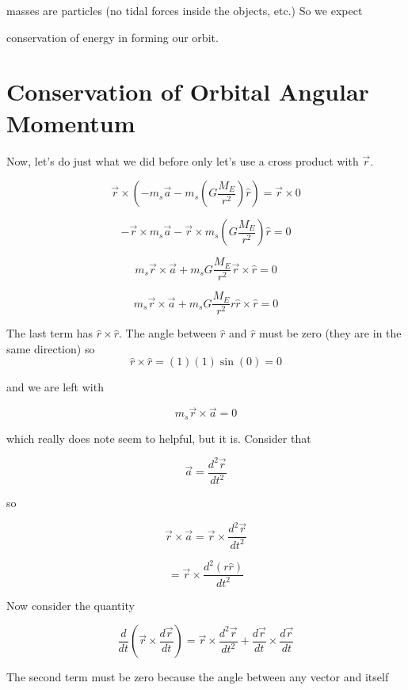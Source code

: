 masses are particles (no tidal forces inside the objects, etc.) So we expect

conservation of energy in forming our orbit.


\section{Conservation of Orbital Angular Momentum}


Now, let's do just what we did before only let's use a cross product with 
$\overrightarrow{r}$. 

$$\overrightarrow{r}\times \left( -m_{s}\overrightarrow{a}-m_{s}\left( G\frac{M_{E}}{r^{2}}\right) \hat{r}\right) =\overrightarrow{r}\times 0
$$

$$-\overrightarrow{r}\times m_{s}\overrightarrow{a}-\overrightarrow{r}\times m_{s}\left( G\frac{M_{E}}{r^{2}}\right) \hat{r}=0
$$

$$m_{s}\overrightarrow{r}\times \overrightarrow{a}+m_{s}G\frac{M_{E}}{r^{2}}\overrightarrow{r}\times \hat{r}=0
$$

$$m_{s}\overrightarrow{r}\times \overrightarrow{a}+m_{s}G\frac{M_{E}}{r^{2}}r\hat{r}\times \hat{r}=0
$$

The last term has $\hat{r}\times \hat{r}.$ The angle between $\hat{r}$ and $\hat{r}$ must be zero (they are in the same direction) so 
$$\hat{r}\times \hat{r}=\left( 1\right) \left( 1\right) \sin \left( 0\right) =0$$

and we are left with 

$$m_{s}\overrightarrow{r}\times \overrightarrow{a}=0$$

which really does note seem to helpful, but it is. Consider that 

$$\overrightarrow{a}=\frac{d^{2}\overrightarrow{r}}{dt^{2}}$$

so 

$$\overrightarrow{r}\times \overrightarrow{a}=\overrightarrow{r}\times \frac{d^{2}\overrightarrow{r}}{dt^{2}}$$

$$=\overrightarrow{r}\times \frac{d^{2}\left( r\hat{r}\right) }{dt^{2}}$$


Now consider the quantity 

$$\frac{d}{dt}\left( \overrightarrow{r}\times \frac{d\overrightarrow{r}}{dt}\right)=\overrightarrow{r}\times\frac{d^{2}\overrightarrow{r}}{dt^{2}}+\frac{d\overrightarrow{r}}{dt}\times \frac{d\overrightarrow{r}}{dt}$$

The second term must be zero because the angle between any vector and itself

